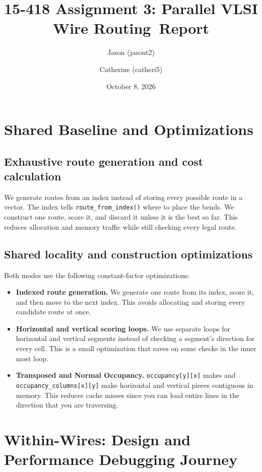 \documentclass[11pt]{article}
\title{15-418 Assignment 3: Parallel VLSI Wire Routing\
\large Report}
\author{Jason (jasont2) \and Catherine (catheri5)}
\date{October 8, 2026}
\begin{document}
\maketitle

\section{Shared Baseline and Optimizations}
\label{sec:shared}

\subsection{Exhaustive route generation and cost calculation}

We generate routes from an index instead of storing every possible route in a
vector. The index tells \texttt{route\_from\_index()} where to place the bends.
We construct one route, score it, and discard it unless it is the best so far.
This reduces allocation and memory traffic while still checking every legal
route.

\subsection{Shared locality and construction optimizations}

Both modes use the following constant-factor optimizations:

\begin{itemize}
\item \textbf{Indexed route generation.} We generate one route from its index,
score it, and then move to the next index. This avoids allocating and storing
every candidate route at once.
\item \textbf{Horizontal and vertical scoring loops.} We use separate loops for
horizontal and vertical segments instead of checking a segment's direction for
every cell. This is a small optimization that saves on some checks in the inner most loop.
\item \textbf{Transposed and Normal Occupancy.} \texttt{occupancy[y][x]} makes
and \texttt{occupancy\_columns[x][y]} make horizontal and vertical pieces contiguous in memory.
This reduces cache misses since you can load entire lines in the direction that you are traversing.
\end{itemize}

\FloatBarrier
\section{Within-Wires: Design and Performance Debugging Journey}
\label{sec:within}
\end{document}
